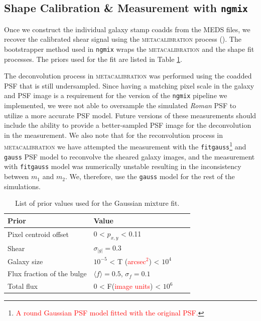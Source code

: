 \documentclass[fleqn,usenatbib]{mnras}
\begin{document}
\subsection{Shape Calibration \& Measurement with \texttt{ngmix}}
\label{subsec:mcal}
Once we construct the individual galaxy stamp coadds from the MEDS files, we recover the calibrated shear signal using the \textsc{metacalibration} process (\citealt{2017arXiv170202600H, 2017ApJ...841...24S}). The bootstrapper method used in \texttt{ngmix} wraps the \textsc{metacalibration} and the shape fit processes. The priors used for the fit are listed in Table \ref{tab:priors}.

The deconvolution process in  \textsc{metacalibration} was performed using the coadded PSF that is still undersampled. Since having a matching pixel scale in the galaxy and PSF image is a requirement for the version of the \texttt{ngmix} pipeline we implemented, we were not able to oversample the simulated \emph{Roman} PSF to utilize a more accurate PSF model. Future versions of these measurements should include the ability to provide a better-sampled PSF image for the deconvolution in the measurement. 
We also note that for the reconvolution process in \textsc{metacalibration} we have attempted the measurement with the \texttt{fitgauss}\footnote{\textcolor{red}{A round Gaussian PSF model fitted with the original PSF.}} and \texttt{gauss} PSF model to reconvolve the sheared galaxy images, and the measurement with \texttt{fitgauss} model was numerically unstable resulting in the inconsistency between $m_{1}$ and $m_{2}$. We, therefore, use the \texttt{gauss} model for the rest of the simulations.

\begin{table}
    \centering
    \begin{tabular}{|p{3cm}||p{3cm}|p{3cm}|p{3cm}|}
    \hline
    Prior & Value \\
    \hline
    Pixel centroid offset & 0 < $p_{x,y}$ < 0.11\\
    Shear & $\sigma_{|g|} = 0.3$\\
    Galaxy size & $10^{-5}$ < T (\textcolor{red}{arcsec$^2$}) < $10^{4}$\\
    Flux fraction of the bulge  & $\langle f\rangle = 0.5$, $\sigma_{f} = 0.1$\\
    Total flux & $0$ < F(\textcolor{red}{image units}) < $10^{6}$\\
    \hline
    \end{tabular}
    \caption{List of prior values used for the Gaussian mixture fit.}
    \label{tab:priors}
\end{table}
\end{document}

